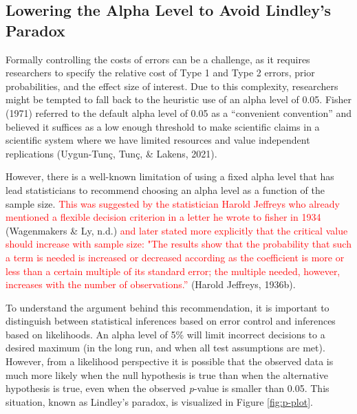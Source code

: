 \documentclass[
  english,
  ,man, a4paper,floatsintext]{apa6}
\begin{document}
\hypertarget{lowering-the-alpha-level-to-avoid-lindleys-paradox}{%
\subsection{Lowering the Alpha Level to Avoid Lindley's Paradox}\label{lowering-the-alpha-level-to-avoid-lindleys-paradox}}

Formally controlling the costs of errors can be a challenge, as it requires researchers to specify the relative cost of Type 1 and Type 2 errors, prior probabilities, and the effect size of interest. Due to this complexity, researchers might be tempted to fall back to the heuristic use of an alpha level of 0.05. Fisher (1971) referred to the default alpha level of 0.05 as a ``convenient convention'' and believed it suffices as a low enough threshold to make scientific claims in a scientific system where we have limited resources and value independent replications (Uygun-Tunç, Tunç, \& Lakens, 2021).

However, there is a well-known limitation of using a fixed alpha level that has lead statisticians to recommend choosing an alpha level as a function of the sample size.
\textcolor{red}{This was suggested by the statistician Harold Jeffreys who already mentioned a flexible decision criterion in a letter he wrote to fisher in 1934} (Wagenmakers \& Ly, n.d.)
\textcolor{red}{and later stated more explicitly that the critical value should increase with sample size: "The results show that the probability that such a term is needed is increased or decreased according as the coefficient is more or less than a certain multiple of its standard error; the multiple needed, however, increases with the number of observations.”} (Harold Jeffreys, 1936b).

To understand the argument behind this recommendation, it is important to distinguish between statistical inferences based on error control and inferences based on likelihoods. An alpha level of 5\% will limit incorrect decisions to a desired maximum (in the long run, and when all test assumptions are met). However, from a likelihood perspective it is possible that the observed data is much more likely when the null hypothesis is true than when the alternative hypothesis is true, even when the observed \emph{p}-value is smaller than 0.05. This situation, known as Lindley's paradox, is visualized in Figure \ref{fig:p-plot}.
\end{document}
